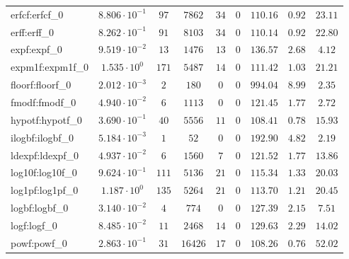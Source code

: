 \begin{tabular}{|l|c|c|c|c|c|c|c|c|}
erfcf:erfcf\_0               & $ 8.806 \cdot 10^{-1} $ & $ 97     $ & $ 7862   $ & $ 34  $ & $ 0   $ & $ 110.16      $ & $ 0.92    $ & $ 23.11   $ \\
erff:erff\_0                 & $ 8.262 \cdot 10^{-1} $ & $ 91     $ & $ 8103   $ & $ 34  $ & $ 0   $ & $ 110.14      $ & $ 0.92    $ & $ 22.80   $ \\
expf:expf\_0                 & $ 9.519 \cdot 10^{-2} $ & $ 13     $ & $ 1476   $ & $ 13  $ & $ 0   $ & $ 136.57      $ & $ 2.68    $ & $ 4.12    $ \\
expm1f:expm1f\_0             & $ 1.535 \cdot 10^{0}  $ & $ 171    $ & $ 5487   $ & $ 14  $ & $ 0   $ & $ 111.42      $ & $ 1.03    $ & $ 21.21   $ \\
floorf:floorf\_0             & $ 2.012 \cdot 10^{-3} $ & $ 2      $ & $ 180    $ & $ 0   $ & $ 0   $ & $ 994.04      $ & $ 8.99    $ & $ 2.35    $ \\
fmodf:fmodf\_0               & $ 4.940 \cdot 10^{-2} $ & $ 6      $ & $ 1113   $ & $ 0   $ & $ 0   $ & $ 121.45      $ & $ 1.77    $ & $ 2.72    $ \\
hypotf:hypotf\_0             & $ 3.690 \cdot 10^{-1} $ & $ 40     $ & $ 5556   $ & $ 11  $ & $ 0   $ & $ 108.41      $ & $ 0.78    $ & $ 15.93   $ \\
ilogbf:ilogbf\_0             & $ 5.184 \cdot 10^{-3} $ & $ 1      $ & $ 52     $ & $ 0   $ & $ 0   $ & $ 192.90      $ & $ 4.82    $ & $ 2.19    $ \\
ldexpf:ldexpf\_0             & $ 4.937 \cdot 10^{-2} $ & $ 6      $ & $ 1560   $ & $ 7   $ & $ 0   $ & $ 121.52      $ & $ 1.77    $ & $ 13.86   $ \\
log10f:log10f\_0             & $ 9.624 \cdot 10^{-1} $ & $ 111    $ & $ 5136   $ & $ 21  $ & $ 0   $ & $ 115.34      $ & $ 1.33    $ & $ 20.03   $ \\
log1pf:log1pf\_0             & $ 1.187 \cdot 10^{0}  $ & $ 135    $ & $ 5264   $ & $ 21  $ & $ 0   $ & $ 113.70      $ & $ 1.21    $ & $ 20.45   $ \\
logbf:logbf\_0               & $ 3.140 \cdot 10^{-2} $ & $ 4      $ & $ 774    $ & $ 0   $ & $ 0   $ & $ 127.39      $ & $ 2.15    $ & $ 7.51    $ \\
logf:logf\_0                 & $ 8.485 \cdot 10^{-2} $ & $ 11     $ & $ 2468   $ & $ 14  $ & $ 0   $ & $ 129.63      $ & $ 2.29    $ & $ 14.02   $ \\
powf:powf\_0                 & $ 2.863 \cdot 10^{-1} $ & $ 31     $ & $ 16426  $ & $ 17  $ & $ 0   $ & $ 108.26      $ & $ 0.76    $ & $ 52.02   $ \\

\end{tabular}
